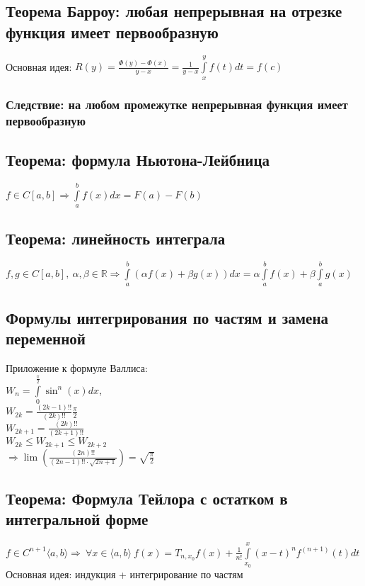 \documentclass[12pt]{report} %
\begin{document}
\subsection*{\textbf{Теорема Барроу: любая непрерывная на отрезке функция имеет первообразную}}
Основная идея: $R(y) = \frac{\Phi(y) - \Phi(x)}{y - x} = \frac{1}{y - x}\displaystyle\int\limits_{x}^{y}{f(t)dt} = f(c)$

\subsubsection*{\textbf{Следствие: на любом промежутке непрерывная функция имеет первообразную}}

\subsection*{\textbf{Теорема: формула Ньютона-Лейбница}}
$f \in C[a, b] \Rightarrow \displaystyle\int\limits_{a}^{b}{f(x)dx} = F(a) - F(b)$

\subsection*{\textbf{Теорема: линейность интеграла}}
$f, g \in C[a, b], \ \alpha, \beta \in \mathbb{R} \Rightarrow \displaystyle\int\limits_{a}^{b}{(\alpha f(x) + \beta g(x))dx} =  \alpha\displaystyle\int\limits_{a}^{b}{f(x)} + \beta\displaystyle\int\limits_{a}^{b}{g(x)}$

\subsection*{\textbf{Формулы интегрирования по частям и замена переменной}}
\begin{spacing}{1.5}
Приложение к формуле Валлиса:\\
\noindent $W_{n} = \displaystyle\int\limits_{0}^{\frac{\pi}{2}}{\sin^n(x)dx}$,\\
$W_{2k} = \frac{(2k - 1)!!}{(2k)!!}\frac{\pi}{2}$\\
$W_{2k + 1} = \frac{(2k)!!}{(2k + 1)!!}$\\
$W_{2k} \leqslant W_{2k + 1} \leqslant W_{2k + 2}$\\
$\Rightarrow \lim\left(\frac{(2n)!!}{(2n - 1)!! \cdot \sqrt{2n + 1}}\right) = \sqrt{\frac{\pi}{2}}$
\end{spacing}

\subsection*{\textbf{Теорема: Формула Тейлора с остатком в интегральной форме}}
\begin{spacing}{1.3}
$f \in C^{n + 1}\langle a, b  \rangle \Rightarrow \ \forall x \in \langle a, b \rangle \ 
f(x) = T_{n, x_{0}}{f(x)} + \frac{1}{n!}\displaystyle\int\limits_{x_0}^{x}(x - t)^nf^{(n + 1)}(t)dt$\\
Основная идея: индукция + интегрирование по частям
\end{spacing}
\end{document}
